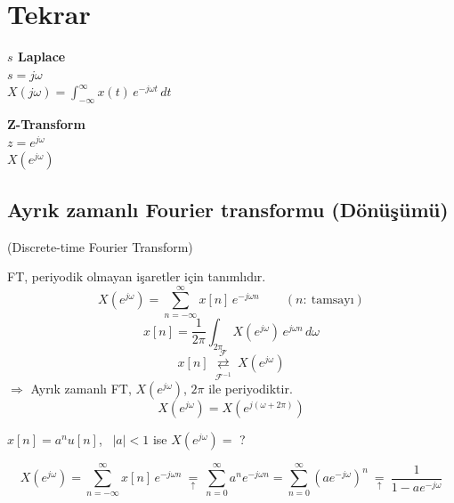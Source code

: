 \documentclass[11pt,a4paper]{article}
\begin{document}

\nopagebreak
\section{Tekrar}
\noindent
\begin{minipage}[t]{0.48\linewidth}
  \textbf{$s$ Laplace}\\[1mm]
  $s=j\omega$\\[1mm]
  $X(j\omega)=\displaystyle\int_{-\infty}^{\infty}x(t)\,e^{-j\omega t}\,dt$
\end{minipage}\hfill
\begin{minipage}[t]{0.48\linewidth}
  \textbf{Z-Transform}\\[1mm]
  $z=e^{j\omega}$\\[1mm]
  $X(e^{j\omega})$
\end{minipage}

\subsection{Ayrık zamanlı Fourier transformu (Dönüşümü)}
(Discrete-time Fourier Transform)

FT, periyodik olmayan işaretler için tanımlıdır.
\[ X(e^{j\omega})=\sum_{n=-\infty}^{\infty}x[n]\,e^{-j\omega n}\qquad (n:\ \text{tamsayı}) \]
\[ x[n]=\frac{1}{2\pi}\int_{2\pi}X(e^{j\omega})\,e^{j\omega n}\,d\omega \]
\[ x[n]\ \overset{\mathcal{F}}{\underset{\mathcal{F}^{-1}}{\rightleftarrows}}\ X(e^{j\omega}) \]
$\Rightarrow$ Ayrık zamanlı FT, $X(e^{j\omega})$, $2\pi$ ile periyodiktir.
\[ X(e^{j\omega})=X(e^{j(\omega+2\pi)}) \]

\begin{ornek}
  $x[n]=a^n u[n]$, \ $|a|<1$ ise $X(e^{j\omega})=$ ?
\end{ornek}\nopagebreak
\[ X(e^{j\omega})=\sum_{n=-\infty}^{\infty}x[n]\,e^{-j\omega n}\ \underset{\uparrow}{=}\ \sum_{n=0}^{\infty}a^n e^{-j\omega n}=\sum_{n=0}^{\infty}(ae^{-j\omega})^n\ \underset{\uparrow}{=}\ \frac{1}{1-ae^{-j\omega}} \]
\end{document}
